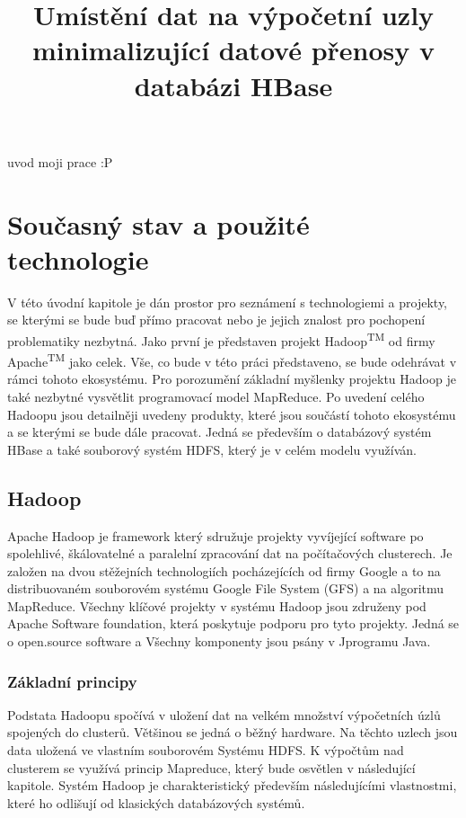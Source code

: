 \documentclass[thesis=M,czech]{FITthesis}[2012/06/26]
\title{Umístění dat na výpočetní uzly minimalizující datové přenosy v databázi HBase}
\begin{document}

\begin{introduction}
	uvod moji prace :P
\end{introduction}

\chapter{Současný stav a použité technologie}
V této úvodní kapitole je dán prostor pro seznámení s technologiemi a projekty, se kterými se bude buď přímo pracovat nebo je jejich znalost pro pochopení problematiky nezbytná. Jako první je představen projekt Hadoop\textsuperscript{TM} od firmy Apache\textsuperscript{TM} jako celek. Vše, co bude v této práci představeno, se bude odehrávat v rámci tohoto ekosystému. Pro porozumění základní myšlenky projektu Hadoop je také nezbytné vysvětlit programovací model MapReduce. Po uvedení celého Hadoopu jsou detailněji uvedeny produkty, které jsou součástí tohoto ekosystému a se kterými se bude dále pracovat. Jedná se především o databázový systém HBase a také souborový systém HDFS, který je v celém modelu využíván. 


\section{Hadoop}
Apache Hadoop je framework který sdružuje projekty  vyvíjející software  po spolehlivé, škálovatelné a paralelní zpracování dat na počítačových clusterech. Je založen na dvou stěžejních  technologiích pocházejících od firmy Google  a to na distribuovaném souborovém systému Google File System (GFS) a na algoritmu MapReduce\cite{HadoopDum}. Všechny klíčové projekty v systému Hadoop jsou združeny  pod Apache Software foundation, která poskytuje podporu pro tyto projekty. Jedná se o open.source software a Všechny komponenty jsou psány v Jprogramu Java.

\subsection{Základní principy}
Podstata Hadoopu spočívá v uložení dat na velkém množství výpočetních úzlů spojených do clusterů. Většinou se jedná o běžný hardware. Na těchto uzlech jsou data uložená ve vlastním souborovém Systému HDFS. K výpočtům nad clusterem se využívá princip Mapreduce, který bude osvětlen v následující kapitole. Systém Hadoop je charakteristický především následujícími vlastnostmi, které ho odlišují od klasických databázových systémů.
\end{document}
